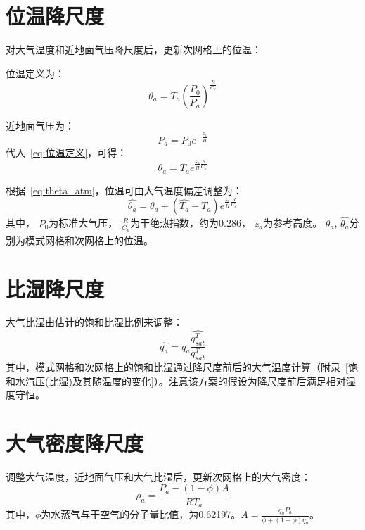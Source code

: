 \section{位温降尺度}
对大气温度和近地面气压降尺度后，更新次网格上的位温：

位温定义为：
\begin{equation}\label{eq:位温定义}
\theta_{a}=T_{a} \left(\frac{P_0}{P_{a}}\right)^\frac{R}{C_{p}}
\end{equation}

近地面气压为：
\begin{equation}\label{eq:近地面气压}
{P_{a}}=P_{0} e^{-\frac{z_{a}}{\bar{H}}}
\end{equation}
%
代入~\eqref{eq:位温定义}，可得：
\begin{equation}\label{eq:theta_atm}
\theta_{a}=T_{a} e^{\frac{z_{a}}{\bar{H}} \frac{R}{C_{p}}}
\end{equation}

根据~\eqref{eq:theta_atm}，位温可由大气温度偏差调整为：
\begin{equation}
\hat{\theta_{a}}=\theta_{a}+\left(\hat{T_{a}}-T_{a}\right) e^{\frac{z_{a}}{\bar{H}} \frac{R}{C_{p}}}
\end{equation}
其中，
$P_{0}$为标准大气压，
$\frac{R}{C_{p}}$为干绝热指数，约为0.286，
$z_{a}$为参考高度。
$\theta_{a}$, $\hat{\theta_{a}}$分别为模式网格和次网格上的位温。

\section{比湿降尺度}
大气比湿由估计的饱和比湿比例来调整：
\begin{equation}
\hat{q_{a}}=q_{a} \frac{\hat{q_{sat}^T}}{q_{sat}^T} 
\end{equation}
其中，模式网格和次网格上的饱和比湿通过降尺度前后的大气温度计算（附录~\ref{饱和水汽压(比湿)及其随温度的变化}）。注意该方案的假设为降尺度前后满足相对湿度守恒。

\section{大气密度降尺度}
调整大气温度，近地面气压和大气比湿后，更新次网格上的大气密度：
\begin{equation}
\rho_{a}=\frac{P_{a}-(1-\phi)A}{R T_{a}}
\end{equation}
其中，$\phi$为水蒸气与干空气的分子量比值，为0.62197。$A=\frac{q_{a} P_{a}}{\phi +(1-\phi)q_{a}}$。

